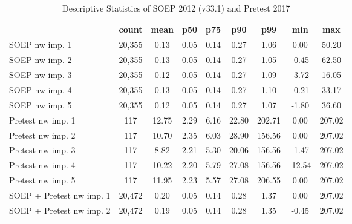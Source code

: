 \begin{table}[htbp]\centering
\def\sym#1{\ifmmode^{#1}\else\(^{#1}\)\fi}
\caption{Descriptive Statistics of SOEP 2012 (v33.1) and Pretest 2017}
\begin{tabular}{l*{1}{cccccccc}}
\hline\hline
                                            &       count&        mean&         p50&         p75&         p90&         p99&         min&         max\\
\hline
SOEP nw imp. 1                              &      20,355&        0.13&        0.05&        0.14&        0.27&        1.06&        0.00&       50.20\\
SOEP nw imp. 2                              &      20,355&        0.13&        0.05&        0.14&        0.27&        1.05&       -0.45&       62.50\\
SOEP nw imp. 3                              &      20,355&        0.12&        0.05&        0.14&        0.27&        1.09&       -3.72&       16.05\\
SOEP nw imp. 4                              &      20,355&        0.13&        0.05&        0.14&        0.27&        1.10&       -0.21&       33.17\\
SOEP nw imp. 5                              &      20,355&        0.12&        0.05&        0.14&        0.27&        1.07&       -1.80&       36.60\\
Pretest nw imp. 1                           &         117&       12.75&        2.29&        6.16&       22.80&      202.71&        0.00&      207.02\\
Pretest nw imp. 2                           &         117&       10.70&        2.35&        6.03&       28.90&      156.56&        0.00&      207.02\\
Pretest nw imp. 3                           &         117&        8.82&        2.21&        5.30&       20.06&      156.56&       -1.47&      207.02\\
Pretest nw imp. 4                           &         117&       10.22&        2.20&        5.79&       27.08&      156.56&      -12.54&      207.02\\
Pretest nw imp. 5                           &         117&       11.95&        2.23&        5.57&       27.08&      206.55&        0.00&      207.02\\
SOEP + Pretest nw imp. 1                    &      20,472&        0.20&        0.05&        0.14&        0.28&        1.37&        0.00&      207.02\\
SOEP + Pretest nw imp. 2                    &      20,472&        0.19&        0.05&        0.14&        0.28&        1.35&       -0.45&      207.02\\

\end{tabular}
\end{table}
